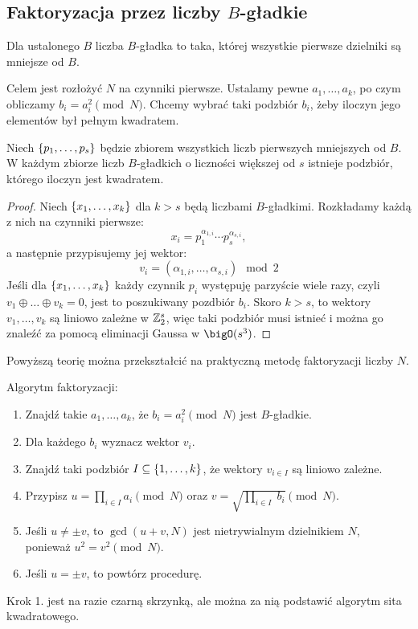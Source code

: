 \subsection{Faktoryzacja przez liczby \( B \)-gładkie}
\begin{definition}
    Dla ustalonego \( B \) liczba \( B \)-gładka to taka, której wszystkie pierwsze dzielniki są mniejsze od \( B \).
\end{definition}
    
Celem jest rozłożyć \( N \) na czynniki pierwsze. Ustalamy pewne \( a_1, \dots, a_k \), po czym obliczamy \( b_i = a_i^2 \pmod{N} \). Chcemy wybrać taki podzbiór \(b_i \), żeby iloczyn jego elementów był pełnym kwadratem.

\begin{lemma}
    Niech \( \set{p_1, \dots, p_{s}} \) będzie zbiorem wszystkich liczb pierwszych mniejszych od \( B \). W każdym zbiorze liczb \( B \)-gładkich o liczności większej od \( s \) istnieje podzbiór, którego iloczyn jest kwadratem.
\end{lemma}
\begin{proof}
    Niech \( \set{x_1, \dots, x_k} \) dla \( k > s \) będą liczbami \( B \)-gładkimi. Rozkładamy każdą z nich na czynniki pierwsze:
    \[
        x_i = p_1^{\alpha_{1, i}} \cdots p_s^{\alpha_{s, i}},
    \]
    a następnie przypisujemy jej wektor:
    \[
        v_i = (\alpha_{1, i}, \dots, \alpha_{s, i}) \mod 2
    \]
    Jeśli dla \( \set{x_1, \dots, x_k} \) każdy czynnik \( p_i \) występuję parzyście wiele razy, czyli \( v_1 \oplus \ldots \oplus v_k = 0 \), jest to poszukiwany pozdbiór \( b_i \).
    Skoro \( k > s \), to wektory \( v_1, \dots, v_k \) są liniowo zależne w \( \mathbb{Z}_2^{s} \), więc taki podzbiór musi istnieć i można go znaleźć za pomocą eliminacji Gaussa w \( \bigO(s^3) \).
\end{proof}
Powyższą teorię można przekształcić na praktyczną metodę faktoryzacji liczby \( N \).
\begin{greyframe}
    Algorytm faktoryzacji:
    \begin{enumerate}
        \item Znajdź takie \( a_1, \dots, a_k \), że \( b_i = a_i^2 \pmod{N} \) jest \( B \)-gładkie.
        \item Dla każdego \( b_i \) wyznacz wektor \( v_i \).
        \item Znajdź taki podzbiór \( I \subseteq \set{1, \dots, k} \), że wektory \( v_{i \in I} \) są liniowo zależne.
        \item Przypisz \( u = \prod_{i \in I} a_i \pmod{N} \) oraz \( v = \sqrt{\prod_{i \in I}\; b_i} \pmod{N} \).
        \item Jeśli \( u \neq \pm v \), to \( \gcd(u + v, N) \) jest nietrywialnym dzielnikiem \( N \), \\ ponieważ \( u^2 = v^2 \pmod{N} \).
        \item Jeśli \( u = \pm v \), to powtórz procedurę.
    \end{enumerate}
\end{greyframe}
Krok 1. jest na razie czarną skrzynką, ale można za nią podstawić algorytm sita kwadratowego.

